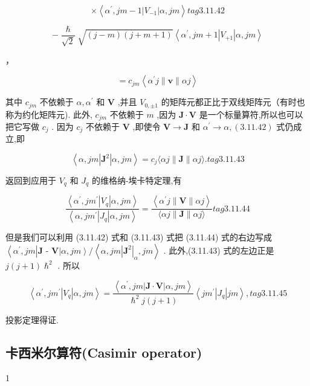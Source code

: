 $$
\times \left\langle {{\alpha }^{\prime },{jm} - 1\left| {V}_{-1}\right| \alpha ,{jm}}\right\rangle tag{3.11.42}
$$

$$
- \frac{\hslash }{\sqrt{2}}\sqrt{\left( {j - m}\right) \left( {j + m + 1}\right) }\left\langle {{\alpha }^{\prime },{jm} + 1\left| {V}_{+1}\right| \alpha ,{jm}}\right\rangle
$$

，

$$
= {c}_{jm}\left\langle {{\alpha }^{\prime }j\parallel \mathbf{v}\parallel {\alpha j}}\right\rangle
$$

其中 ${c}_{jm}$ 不依赖于 $\alpha ,{\alpha }^{\prime }$ 和 $\mathbf{V}$ ,并且 ${V}_{0, \pm 1}$ 的矩阵元都正比于双线矩阵元（有时也称为约化矩阵元). 此外, ${c}_{jm}$ 不依赖于 $m$ ,因为 $\mathbf{J} \cdot \mathbf{V}$ 是一个标量算符,所以也可以把它写做 ${c}_{j}$ . 因为 ${c}_{j}$ 不依赖于 $\mathbf{V}$ ,即使令 $\mathbf{V} \rightarrow \mathbf{J}$ 和 ${\alpha }^{\prime } \rightarrow \alpha ,\left( {3.11.42}\right)$ 式仍成立,即

$$
\left\langle {\alpha ,{jm}\left| {\mathbf{J}}^{2}\right| \alpha ,{jm}}\right\rangle = {c}_{j}\langle {\alpha j}\parallel \mathbf{J}\parallel {\alpha j}\rangle . tag{3.11.43}
$$

返回到应用于 ${V}_{q}$ 和 ${J}_{q}$ 的维格纳-埃卡特定理,有

$$
\frac{\left\langle {\alpha }^{\prime }, j{m}^{\prime }\left| {V}_{q}\right| \alpha, jm\right\rangle }{\left\langle \alpha, j{m}^{\prime }\left| {J}_{q}\right| \alpha, jm\right\rangle } = \frac{\left\langle {\alpha }^{\prime }j\parallel \mathbf{V}\parallel \alpha j\right\rangle }{\langle {\alpha j}\parallel \mathbf{J}\parallel {\alpha j}\rangle } tag{3.11.44}
$$

但是我们可以利用 (3.11.42) 式和 (3.11.43) 式把 (3.11.44) 式的右边写成 $\left\langle {{\alpha }^{\prime },{jm}}\right| \mathbf{J}$ - $\mathbf{V}\left| {\alpha ,{jm}}\right\rangle /\left\langle {\alpha ,{jm}{\left| {\mathbf{J}}^{2}\right| }_{\alpha },{jm}}\right\rangle$ . 此外,(3.11.43) 式的左边正是 $j\left( {j + 1}\right) {\hslash }^{2}$ . 所以

$$
\left\langle {{\alpha }^{\prime }, j{m}^{\prime }\left| {V}_{q}\right| \alpha ,{jm}}\right\rangle = \frac{\left\langle {\alpha }^{\prime }, jm\left| \mathbf{J} \cdot \mathbf{V}\right| \alpha, jm\right\rangle }{{\hslash }^{2}j\left( {j + 1}\right) }\left\langle {j{m}^{\prime }\left| {J}_{q}\right| {jm}}\right\rangle , tag{3.11.45}
$$

投影定理得证.

\subsection{卡西米尔算符(Casimir operator)}
1

